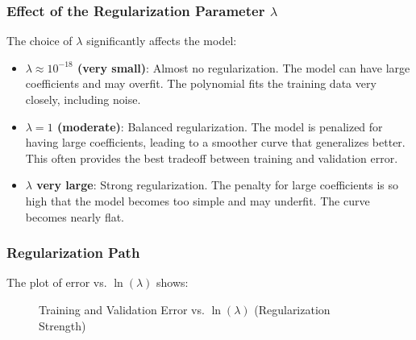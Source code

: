 \documentclass[11pt,a4paper]{article}
\theoremstyle{definition}
\theoremstyle{plain}
\theoremstyle{remark}
\begin{document}
\subsubsection{Effect of the Regularization Parameter $\lambda$}

The choice of $\lambda$ significantly affects the model:

\begin{itemize}
    \item \textbf{$\lambda \approx 10^{-18}$ (very small)}: Almost no regularization. The model can have large coefficients and may overfit. The polynomial fits the training data very closely, including noise.
    
    \item \textbf{$\lambda = 1$ (moderate)}: Balanced regularization. The model is penalized for having large coefficients, leading to a smoother curve that generalizes better. This often provides the best tradeoff between training and validation error.
    
    \item \textbf{$\lambda$ very large}: Strong regularization. The penalty for large coefficients is so high that the model becomes too simple and may underfit. The curve becomes nearly flat.
\end{itemize}

\subsubsection{Regularization Path}

The plot of error vs. $\ln(\lambda)$ shows:

\begin{figure}[h]
\centering
{}
\caption{Training and Validation Error vs. $\ln(\lambda)$ (Regularization Strength)}
\end{figure}
\end{document}
